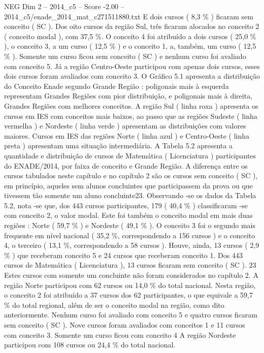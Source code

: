 \begin{textsample}{NEG Dim 2 – 2014\_c5 – Score -2.00 – 2014\_c5/enade\_2014\_mat\_c271511880.txt}
E dois cursos ( 8,3 \% ) ficaram sem conceito ( SC ).
Dos oito cursos da região Sul, três ficaram alocados no conceito 2 ( conceito modal ), com 37,5 \%.
O conceito 4 foi atribuído a dois cursos ( 25,0 \% ), o conceito 3, a um curso ( 12,5 \% ) e o conceito 1, a, também, um curso ( 12,5 \% ).
Somente um curso ficou sem conceito ( SC ) e nenhum curso foi avaliado com conceito 5.
Já a região Centro-Oeste participou com apenas dois cursos, esses dois cursos foram avaliados com conceito 3.
O Gráfico 5.1 apresenta a distribuição do Conceito Enade segundo Grande Região : poligonais mais à esquerda representam Grandes Regiões com pior distribuição, e poligonais mais à direita, Grandes Regiões com melhores conceitos.
A região Sul ( linha roxa ) apresenta os cursos em IES com conceitos mais baixos, ao passo que as regiões Sudeste ( linha vermelha ) e Nordeste ( linha verde ) apresentam as distribuições com valores maiores.
Cursos em IES das regiões Norte ( linha azul ) e Centro-Oeste ( linha preta ) apresentam uma situação intermediária.
A Tabela 5.2 apresenta a quantidade e distribuição de cursos de Matemática ( Licenciatura ) participantes do ENADE/2014, por faixa de conceito e Grande Região.
A diferença entre os cursos tabulados neste capítulo e no capítulo 2 são os cursos sem conceito ( SC ), em princípio, aqueles sem alunos concluintes que participassem da prova ou que tivessem tão somente um aluno concluinte23.
Observando -se os dados da Tabela 5.2, nota -se que, dos 443 cursos participantes, 179 ( 40,4 \% ) classificaram -se com conceito 2, o valor modal.
Este foi também o conceito modal em mais duas regiões : Norte ( 59,7 \% ) e Nordeste ( 49,1 \% ).
O conceito 3 foi o segundo mais frequente em nível nacional ( 35,2 \%, correspondendo a 156 cursos ) e o conceito 4, o terceiro ( 13,1 \%, correspondendo a 58 cursos ).
Houve, ainda, 13 cursos ( 2,9 \% ) que receberam conceito 5 e 24 cursos que receberam conceito 1.
Dos 443 cursos de Matemática ( Licenciatura ), 13 cursos ficaram sem conceito ( SC ). 23 Estes cursos com somente um concluinte não foram considerados no capítulo 2.
A região Norte participou com 62 cursos ou 14,0 \% do total nacional.
Nesta região, o conceito 2 foi atribuído a 37 cursos dos 62 participantes, o que equivale a 59,7 \% do total regional, além de ser o conceito modal na região, como dito anteriormente.
Nenhum curso foi avaliado com conceito 5 e quatro cursos ficaram sem conceito ( SC ).
Nove cursos foram avaliados com conceitos 1 e 11 cursos com conceito 3.
Somente um curso ficou com conceito 4 A região Nordeste participou com 108 cursos ou 24,4 \% do total nacional.

\end{textsample}
